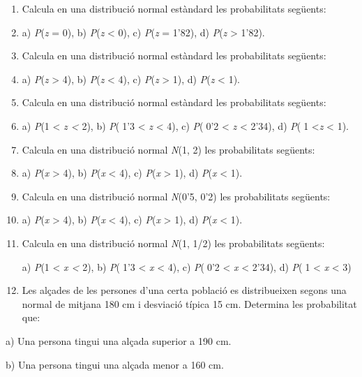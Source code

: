 \begin{enumerate}
\def\labelenumi{\arabic{enumi}.}
\item
  Calcula en una distribució normal estàndard les probabilitats
  següents: 
\item
  a) \emph{P}(\emph{z} = 0), b) \emph{P}(\emph{z} \textless{} 0), c)
  \emph{P}(\emph{z} = 1'82), d) \emph{P}(\emph{z} \textgreater{} 1'82).
\item
  Calcula en una distribució normal estàndard les probabilitats
  següents: 
\item
  a) \emph{P}(\emph{z} \textgreater{} 4), b) \emph{P}(\emph{z}
  \textless{} 4), c) \emph{P}(\emph{z} \textgreater{} 1), d)
  \emph{P}(\emph{z} \textless{} 1).
\item
  Calcula en una distribució normal estàndard les probabilitats
  següents: 
\item
  a) \emph{P}(1 \textless{} \emph{z \textless{} }2), b) \emph{P}(1'3
  \textless{} \emph{z} \textless{} 4), c) \emph{P}(0'2 \textless{}
  \emph{z} \textless{} 2'34), d) \emph{P}(1 \textless{}\emph{z}
  \textless{} 1).
\item
  Calcula en una distribució normal \emph{N}(1, 2) les probabilitats
  següents: 
\item
  a) \emph{P}(\emph{x} \textgreater{} 4), b) \emph{P}(\emph{x}
  \textless{} 4), c) \emph{P}(\emph{x} \textgreater{} 1), d)
  \emph{P}(\emph{x} \textless{} 1).
\item
  Calcula en una distribució normal \emph{N}(0'5, 0'2) les probabilitats
  següents: 
\item
  a) \emph{P}(\emph{x} \textgreater{} 4), b) \emph{P}(\emph{x}
  \textless{} 4), c) \emph{P}(\emph{x} \textgreater{} 1), d)
  \emph{P}(\emph{x} \textless{} 1).
\item
  Calcula en una distribució normal \emph{N}(1, 1/2) les probabilitats
  següents:

  a) \emph{P}(1 \textless{} \emph{x \textless{} }2), b) \emph{P}(1'3
  \textless{} \emph{x} \textless{} 4), c) \emph{P}(0'2 \textless{}
  \emph{x} \textless{} 2'34), d) \emph{P}(1 \textless{} \emph{x}
  \textless{} 3)
\item
  Les alçades de les persones d'una certa població es distribueixen
  segons una normal de mitjana 180 cm i desviació típica 15 cm.
  Determina les probabilitat que: 
\end{enumerate}

a) Una persona tingui una alçada superior a 190 cm.

b) Una persona tingui una alçada menor a 160 cm.

